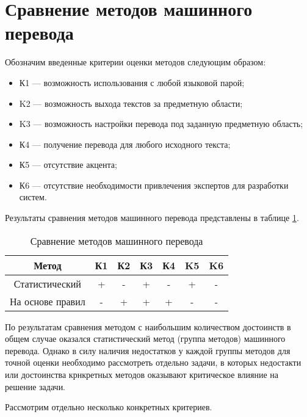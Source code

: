 \section{Сравнение методов машинного перевода}

Обозначим введенные критерии оценки методов следующим образом:

\begin{itemize}[label=---]
	\item К1 --- возможность использования с любой языковой парой;
    \item K2 --- возможность выхода текстов за предметную области;
    \item K3 --- возможность настройки перевода под заданную предметную область;
	\item К4 --- получение перевода для любого исходного текста;
	\item К5 --- отсутствие акцента;
    \item К6 --- отсутствие необходимости привлечения экспертов для разработки систем.
\end{itemize}

Результаты сравнения методов машинного перевода представлены в таблице \ref{tab:comparison}.

\begin{table}[h!]
	\begin{center}
        \captionsetup{justification=raggedright,singlelinecheck=off}
		\caption{\label{tab:comparison}Сравнение методов машинного перевода}
		\begin{tabular}{|c|c|c|c|c|c|c|}
			\hline
			Метод & К1 & К2 & К3 & К4 & K5 & K6 \\ \hline
			Статистический & + & - & + & - & + & -\\ \hline
            На основе правил & - & + & + & + & - & -\\ \hline	
		\end{tabular}			
	\end{center}
\end{table}

По результатам сравнения методом с наибольшим количеством достоинств в общем случае оказался статистический метод (группа методов) машинного перевода.
Однако в силу наличия недостатков у каждой группы методов для точной оценки необходимо рассмотреть отдельно задачи, в которых недостакти или достоинства крнкретных методов оказывают критическое влияние на решение задачи.

Рассмотрим отдельно несколько конкретных критериев.

